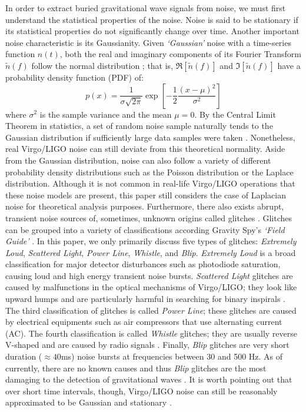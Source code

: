 \documentclass[preprint,
letterpaper,
 amsmath,amssymb,
 aps,
]{revtex4-2}
\begin{document}
In order to extract buried gravitational wave signals from noise, we must first understand the statistical properties of the noise. Noise is said to be stationary if its statistical properties do not significantly change over time. Another important noise characteristic is its Gaussianity. Given \textit{`Gaussian'} noise with a time-series function $n(t)$, both the real and imaginary components of its Fourier Transform $\widetilde{n}(f)$ follow the normal distribution \cite{yamamoto}; that is, $\Re[\widetilde{n}(f)]$ and  $\Im{[\widetilde{n}(f)]}$ have a probability density function (PDF) of:
\begin{equation}
    p(x) = \frac{1}{\sigma\sqrt{2\pi}}\exp{\left[-\frac{1}{2}\frac{(x-\mu)^2}{\sigma^2}\right]}
\end{equation}
where $\sigma^2$ is the sample variance and the mean $\mu = 0$. By the Central Limit Theorem in statistics, a set of random noise sample naturally tends to the Gaussian distribution if sufficiently large data samples were taken \cite{jaranowski2007gravitationalwave}. Nonetheless, real Virgo/LIGO noise can still deviate from this theoretical normality. Aside from the Gaussian distribution, noise can also follow a variety of different probability density distributions such as the Poisson distribution or the Laplace distribution. Although it is not common in real-life Virgo/LIGO operations that these noise models are present, this paper still considers the case of Laplacian noise for theoretical analysis purposes. Furthermore, there also exists abrupt, transient noise sources of, sometimes, unknown origins called glitches \cite{ultimate}. Glitches can be grouped into a variety of classifications according Gravity Spy's \textit{`Field Guide'} \cite{gravityspy}. In this paper, we only primarily discuss five types of glitches: \textit{Extremely Loud}, \textit{Scattered Light}, \textit{Power Line}, \textit{Whistle}, and \textit{Blip}. \textit{Extremely Loud} is a broad classification for major detector disturbances such as photodiode saturation, causing loud and high energy transient noise bursts. \textit{Scattered Light} glitches are caused by malfunctions in the optical mechanisms of Virgo/LIGO; they look like upward humps and are particularly harmful in searching for binary inspirals \cite{gravityspy}. The third classification of glitches is called \textit{Power Line}; these glitches are caused by electrical equipments such as air compressors that use alternating current (AC). The fourth classification is called \textit{Whistle} glitches; they are usually reverse V-shaped and are caused by radio signals \cite{gravityspy}. Finally, \textit{Blip} glitches are very short duration ($\approx 40$ms) noise bursts at frequencies between 30 and 500 Hz. As of currently, there are no known causes and thus \textit{Blip} glitches are the most damaging to the detection of gravitational waves \cite{gravityspy}. It is worth pointing out that over short time intervals, though, Virgo/LIGO noise can still be reasonably approximated to be Gaussian and stationary \cite{collaboration2019open}.
\end{document}
